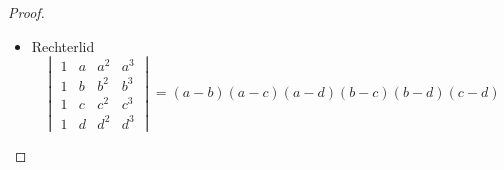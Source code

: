 \documentclass[lineaire_algebra_oplossingen.tex]{subfiles}
\begin{document}
\begin{proof}
\begin{itemize}
\item Rechterlid
\[
\begin{vmatrix}
1 & a & a^2 & a^3\\
1 & b & b^2 & b^3\\
1 & c & c^2 & c^3\\
1 & d & d^2 & d^3
\end{vmatrix}
=
(a-b)(a-c)(a-d)(b-c)(b-d)(c-d)
\]

\end{itemize}
\end{proof}
\end{document}
